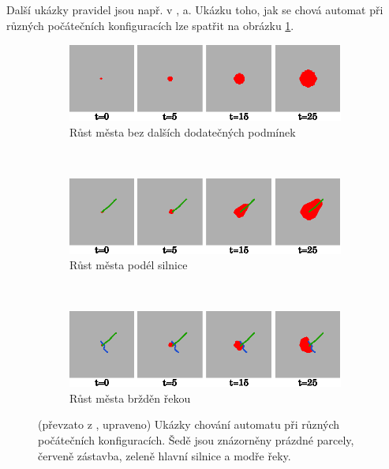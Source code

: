 \documentclass[a4paper,10pt]{article}
\begin{document}
Další ukázky pravidel jsou např. v \cite{Ahm+-CalFuzCelAutModUrbDynSauAr}, \cite{ManHatPra-FuzzCellAutModAppAccUrbGroDynLingTerm} a\cite{LiuPhi-DevCelAutModUrbGroIncFuzSetApp}. Ukázku toho, jak se chová automat při různých počátečních konfiguracích lze spatřit na obrázku \ref{img-VarTransRuls}. 

\begin{figure}[]
    \begin{subfigure}[t]{\textwidth} \centering
      \includegraphics[width=\textwidth]{urban-growt-transitions-1}
      \caption{Růst města bez dalších dodatečných podmínek} 
    \end{subfigure}
    \\
    \begin{subfigure}[t]{\textwidth} \centering
      \includegraphics[width=\textwidth]{urban-growt-transitions-2}
      \caption{Růst města podél silnice} 
    \end{subfigure}
    \\
    \begin{subfigure}[t]{\textwidth} \centering
      \includegraphics[width=\textwidth]{urban-growt-transitions-3}
      \caption{Růst města bržděn řekou} 
    \end{subfigure}

    \caption[Ukázky chování automatu]{(převzato z \cite{LiuPhi-DevCelAutModUrbGroIncFuzSetApp}, upraveno) Ukázky chování automatu při různých počátečních konfiguracích. Šedě jsou znázorněny prázdné parcely, červeně zástavba, zeleně hlavní silnice a modře řeky.} \label{img-VarTransRuls}
\end{figure}
\end{document}
